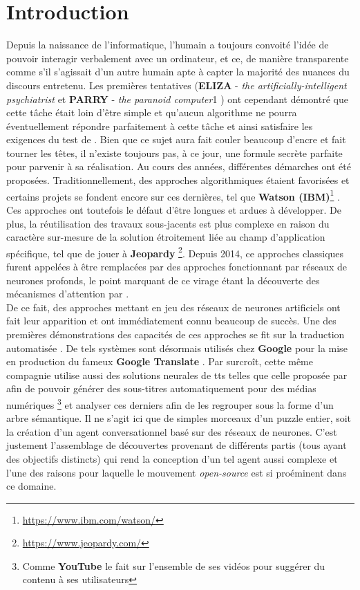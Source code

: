 \section{Introduction}

Depuis la naissance de l'informatique, l'humain a toujours convoité l'idée de pouvoir interagir verbalement avec un ordinateur, et ce, de manière transparente comme s'il s'agissait d'un autre humain apte à capter la majorité des nuances du discours entretenu. Les premières tentatives (\textbf{ELIZA} - \textit{the artificially-intelligent psychiatrist} \cite{elizaWeizenbaum} et \textbf{PARRY} - \textit{the paranoid computer}1 \cite{parryCerf}) ont cependant démontré que cette tâche était loin d'être simple et qu'aucun algorithme ne pourra éventuellement répondre parfaitement à cette tâche et ainsi satisfaire les exigences du test de \cite{turingTest}. Bien que ce sujet aura fait couler beaucoup d'encre et fait tourner les têtes, il n'existe toujours pas, à ce jour, une formule secrète parfaite pour parvenir à sa réalisation. Au cours des années, différentes démarches ont été proposées. Traditionnellement, des approches algorithmiques étaient favorisées et certains projets se fondent encore sur ces dernières, tel que \textbf{Watson (IBM)}\footnote{\url{https://www.ibm.com/watson/}} \cite{ibmWatson}. Ces approches ont toutefois le défaut d'être longues et ardues à développer. De plus, la réutilisation des travaux sous-jacents est plus complexe en raison du caractère sur-mesure de la solution étroitement liée au champ d'application spécifique, tel que de jouer à \textbf{Jeopardy} \footnote{\url{https://www.jeopardy.com/}}. Depuis 2014, ce approches classiques furent appelées à être remplacées par des approches fonctionnant par réseaux de neurones profonds, le point marquant de ce virage étant la découverte des mécanismes d'attention par \cite{attentionMechanism}. \\

De ce fait, des approches mettant en jeu des réseaux de neurones artificiels ont fait leur apparition et ont immédiatement connu beaucoup de succès. Une des premières démonstrations des capacités de ces approches se fit sur la traduction automatisée \cite{attentionMechanism}. De tels systèmes sont désormais utilisés chez \textbf{Google} pour la mise en production du fameux \textbf{Google Translate} \cite{googleTranslate}. Par surcroît, cette même compagnie utilise aussi des solutions neurales de \gls{tts} telles que celle proposée par \cite{acousticModeling} afin de pouvoir générer des sous-titres automatiquement pour des médias numériques \footnote{Comme \textbf{YouTube} le fait sur l'ensemble de ses vidéos pour suggérer du contenu à ses utilisateurs} et analyser ces derniers afin de les regrouper sous la forme d'un arbre sémantique. Il ne s'agit ici que de simples morceaux d'un puzzle entier, soit la création d'un agent conversationnel basé sur des réseaux de neurones. C'est justement l'assemblage de découvertes provenant de différents partis (tous ayant des objectifs distincts) qui rend la conception d'un tel agent aussi complexe et l'une des raisons pour laquelle le mouvement \textit{open-source} est si proéminent dans ce domaine. \\

